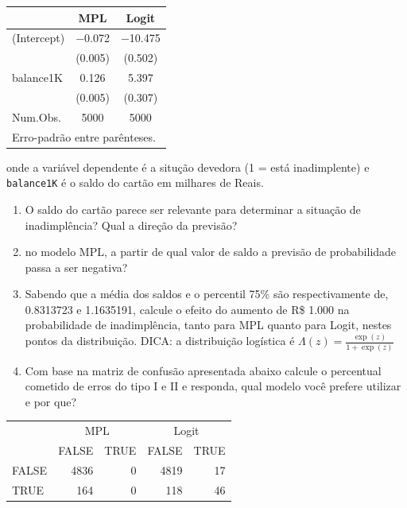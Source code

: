 \documentclass[
]{article}
\begin{document}
\begin{table}
\centering
\begin{tabular}[t]{lcc}
\toprule
  & MPL & Logit\\
\midrule
(Intercept) & \num{-0.072} & \num{-10.475}\\
 & (\num{0.005}) & (\num{0.502})\\
balance1K & \num{0.126} & \num{5.397}\\
 & (\num{0.005}) & (\num{0.307})\\
\midrule
Num.Obs. & \num{5000} & \num{5000}\\
\bottomrule
\multicolumn{3}{l}{\rule{0pt}{1em}Erro-padrão entre parênteses.}\\
\end{tabular}
\end{table}

onde a variável dependente é a situção devedora (1 = está inadimplente)
e \texttt{balance1K} é o saldo do cartão em milhares de Reais.

\begin{enumerate}
\def\labelenumi{\alph{enumi})}
\item
  O saldo do cartão parece ser relevante para determinar a situação de
  inadimplência? Qual a direção da previsão?
\item
  no modelo MPL, a partir de qual valor de saldo a previsão de
  probabilidade passa a ser negativa?
\item
  Sabendo que a média dos saldos e o percentil 75\% são respectivamente
  de, 0.8313723 e 1.1635191, calcule o efeito do aumento de R\$ 1.000 na
  probabilidade de inadimplência, tanto para MPL quanto para Logit,
  nestes pontos da distribuição. DICA: a distribuição logística é
  \(\Lambda(z)=\frac{\exp(z)}{1+\exp(z)}\)
\item
  Com base na matriz de confusão apresentada abaixo calcule o percentual
  cometido de erros do tipo I e II e responda, qual modelo você prefere
  utilizar e por que?
\end{enumerate}

\begin{table}[H]
\centering
\begin{tabular}[t]{lrrrr}
\toprule
\multicolumn{1}{c}{ } & \multicolumn{2}{c}{MPL} & \multicolumn{2}{c}{Logit} \\
\cmidrule(l{3pt}r{3pt}){2-3} \cmidrule(l{3pt}r{3pt}){4-5}
  & FALSE & TRUE & FALSE & TRUE\\
\midrule
FALSE & 4836 & 0 & 4819 & 17\\
TRUE & 164 & 0 & 118 & 46\\
\bottomrule
\end{tabular}
\end{table}
\end{document}
